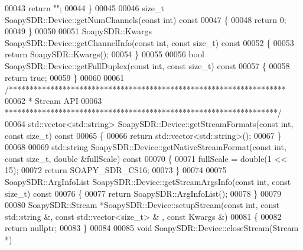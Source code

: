 \begin{DoxyCode}
00043     \textcolor{keywordflow}{return} \textcolor{stringliteral}{""};
00044 \}
00045 
00046 \textcolor{keywordtype}{size\_t} SoapySDR::Device::getNumChannels(\textcolor{keyword}{const} \textcolor{keywordtype}{int})\textcolor{keyword}{ const}
00047 \textcolor{keyword}{}\{
00048     \textcolor{keywordflow}{return} 0;
00049 \}
00050 
00051 SoapySDR::Kwargs SoapySDR::Device::getChannelInfo(\textcolor{keyword}{const} \textcolor{keywordtype}{int}, \textcolor{keyword}{const} \textcolor{keywordtype}{size\_t})\textcolor{keyword}{ const}
00052 \textcolor{keyword}{}\{
00053     \textcolor{keywordflow}{return} SoapySDR::Kwargs();
00054 \}
00055 
00056 \textcolor{keywordtype}{bool} SoapySDR::Device::getFullDuplex(\textcolor{keyword}{const} \textcolor{keywordtype}{int}, \textcolor{keyword}{const} \textcolor{keywordtype}{size\_t})\textcolor{keyword}{ const}
00057 \textcolor{keyword}{}\{
00058     \textcolor{keywordflow}{return} \textcolor{keyword}{true};
00059 \}
00060 
00061 \textcolor{comment}{/*******************************************************************}
00062 \textcolor{comment}{ * Stream API}
00063 \textcolor{comment}{ ******************************************************************/}
00064 std::vector<std::string> SoapySDR::Device::getStreamFormats(\textcolor{keyword}{const} \textcolor{keywordtype}{int}, \textcolor{keyword}{const} \textcolor{keywordtype}{size\_t})\textcolor{keyword}{ const}
00065 \textcolor{keyword}{}\{
00066     \textcolor{keywordflow}{return} std::vector<std::string>();
00067 \}
00068 
00069 std::string SoapySDR::Device::getNativeStreamFormat(\textcolor{keyword}{const} \textcolor{keywordtype}{int}, \textcolor{keyword}{const} \textcolor{keywordtype}{size\_t}, \textcolor{keywordtype}{double} &fullScale)\textcolor{keyword}{ const}
00070 \textcolor{keyword}{}\{
00071     fullScale = double(1 << 15);
00072     \textcolor{keywordflow}{return} SOAPY_SDR_CS16;
00073 \}
00074 
00075 SoapySDR::ArgInfoList SoapySDR::Device::getStreamArgsInfo(\textcolor{keyword}{const} \textcolor{keywordtype}{int}, \textcolor{keyword}{const} \textcolor{keywordtype}{size\_t})\textcolor{keyword}{ const}
00076 \textcolor{keyword}{}\{
00077     \textcolor{keywordflow}{return} SoapySDR::ArgInfoList();
00078 \}
00079 
00080 SoapySDR::Stream *SoapySDR::Device::setupStream(\textcolor{keyword}{const} \textcolor{keywordtype}{int}, \textcolor{keyword}{const} std::string &, \textcolor{keyword}{const} std::vector<size\_t> &
      , \textcolor{keyword}{const} Kwargs &)
00081 \{
00082     \textcolor{keywordflow}{return} \textcolor{keyword}{nullptr};
00083 \}
00084 
00085 \textcolor{keywordtype}{void} SoapySDR::Device::closeStream(Stream *)

\end{DoxyCode}
